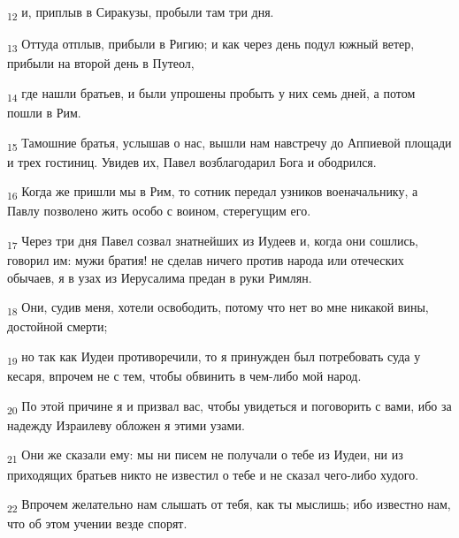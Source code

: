\begin{tcolorbox}
\textsubscript{12} и, приплыв в Сиракузы, пробыли там три дня.
\end{tcolorbox}
\begin{tcolorbox}
\textsubscript{13} Оттуда отплыв, прибыли в Ригию; и как через день подул южный ветер, прибыли на второй день в Путеол,
\end{tcolorbox}
\begin{tcolorbox}
\textsubscript{14} где нашли братьев, и были упрошены пробыть у них семь дней, а потом пошли в Рим.
\end{tcolorbox}
\begin{tcolorbox}
\textsubscript{15} Тамошние братья, услышав о нас, вышли нам навстречу до Аппиевой площади и трех гостиниц. Увидев их, Павел возблагодарил Бога и ободрился.
\end{tcolorbox}
\begin{tcolorbox}
\textsubscript{16} Когда же пришли мы в Рим, то сотник передал узников военачальнику, а Павлу позволено жить особо с воином, стерегущим его.
\end{tcolorbox}
\begin{tcolorbox}
\textsubscript{17} Через три дня Павел созвал знатнейших из Иудеев и, когда они сошлись, говорил им: мужи братия! не сделав ничего против народа или отеческих обычаев, я в узах из Иерусалима предан в руки Римлян.
\end{tcolorbox}
\begin{tcolorbox}
\textsubscript{18} Они, судив меня, хотели освободить, потому что нет во мне никакой вины, достойной смерти;
\end{tcolorbox}
\begin{tcolorbox}
\textsubscript{19} но так как Иудеи противоречили, то я принужден был потребовать суда у кесаря, впрочем не с тем, чтобы обвинить в чем-либо мой народ.
\end{tcolorbox}
\begin{tcolorbox}
\textsubscript{20} По этой причине я и призвал вас, чтобы увидеться и поговорить с вами, ибо за надежду Израилеву обложен я этими узами.
\end{tcolorbox}
\begin{tcolorbox}
\textsubscript{21} Они же сказали ему: мы ни писем не получали о тебе из Иудеи, ни из приходящих братьев никто не известил о тебе и не сказал чего-либо худого.
\end{tcolorbox}
\begin{tcolorbox}
\textsubscript{22} Впрочем желательно нам слышать от тебя, как ты мыслишь; ибо известно нам, что об этом учении везде спорят.
\end{tcolorbox}
